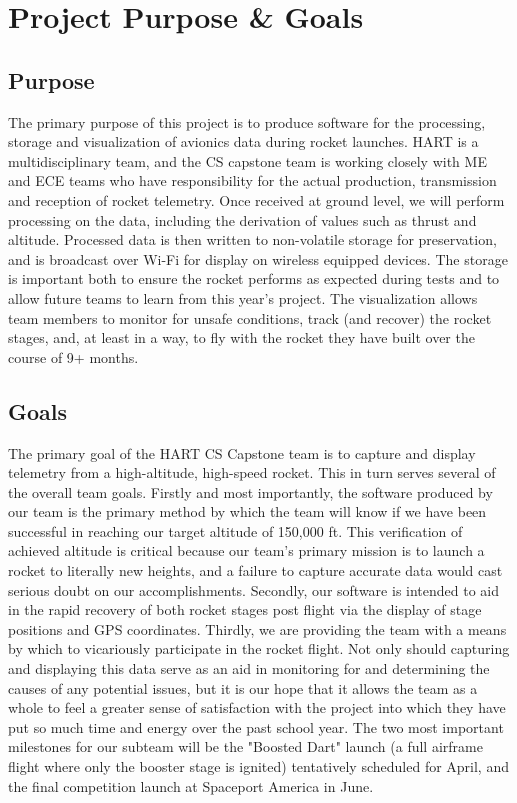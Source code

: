 \documentclass[journal,10pt,onecolumn,compsoc]{IEEEtran}
\begin{document}

\section{Project Purpose \& Goals}

	\subsection{Purpose}
		\noindent The primary purpose of this project is to produce software for the processing, storage and visualization of avionics data during rocket launches.
		HART is a multidisciplinary team, and the CS capstone team is working closely with ME and ECE teams who have responsibility for the actual production, transmission and reception of rocket telemetry.
		Once received at ground level, we will perform processing on the data, including the derivation of values such as thrust and altitude.
		Processed data is then written to non-volatile storage for preservation, and is broadcast over Wi-Fi for display on wireless equipped devices.
		The storage is important both to ensure the rocket performs as expected during tests and to allow future teams to learn from this year's project.
		The visualization allows team members to monitor for unsafe conditions, track (and recover) the rocket stages, and, at least in a way, to fly with the rocket they have built over the course of 9+ months.
	
	\subsection{Goals}
		\noindent The primary goal of the HART CS Capstone team is to capture and display telemetry from a high-altitude, high-speed rocket.
		This in turn serves several of the overall team goals.
		Firstly and most importantly, the software produced by our team is the primary method by which the team will know if we have been successful in reaching our target altitude of 150,000 ft.
		This verification of achieved altitude is critical because our team's primary mission is to launch a rocket to literally new heights, and a failure to capture accurate data would cast serious doubt on our accomplishments.
		Secondly, our software is intended to aid in the rapid recovery of both rocket stages post flight via the display of stage positions and GPS coordinates.
		Thirdly, we are providing the team with a means by which to vicariously participate in the rocket flight.
		Not only should capturing and displaying this data serve as an aid in monitoring for and determining the causes of any potential issues, but it is our hope that it allows the team as a whole to feel a greater sense of satisfaction with the project into which they have put so much time and energy over the past school year.
		The two most important milestones for our subteam will be the "Boosted Dart" launch (a full airframe flight where only the booster stage is ignited) tentatively scheduled for April, and the final competition launch at Spaceport America in June.
\newpage
\end{document}
